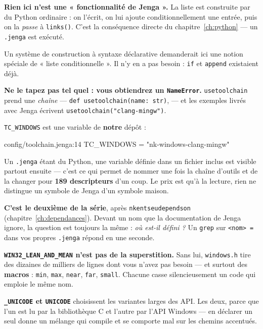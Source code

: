 \begin{nkretenir}
\textbf{Rien ici n'est une « fonctionnalité de Jenga ».} La liste est construite
par du Python ordinaire : on l'écrit, on lui ajoute conditionnellement une
entrée, puis on la \emph{passe} à \texttt{links()}. C'est la conséquence directe
du chapitre~\ref{ch:python} --- un \texttt{.jenga} est exécuté.

Un système de construction à syntaxe déclarative demanderait ici une notion
spéciale de « liste conditionnelle ». Il n'y en a pas besoin : \texttt{if} et
\texttt{append} existaient déjà.
\end{nkretenir}

\begin{nkpiege}
\alerte{}\textbf{Ne le tapez pas tel quel : vous obtiendrez un
\texttt{NameError}.} \texttt{usetoolchain} prend une \emph{chaîne} ---
\texttt{def usetoolchain(name: str)},  --- et
les exemples livrés avec Jenga écrivent \texttt{usetoolchain("clang-mingw")}.

\texttt{TC\_WINDOWS} est une variable de \textbf{notre} dépôt :

\begin{nkcode}{config/toolchain.jenga:14}
TC_WINDOWS = "nk-windows-clang-mingw"
\end{nkcode}

Un \texttt{.jenga} étant du Python, une variable définie dans un fichier inclus
est visible partout ensuite --- c'est ce qui permet de nommer une fois la chaîne
d'outils et de la changer pour \textbf{189 descripteurs} d'un coup. Le prix est
qu'à la lecture, rien ne distingue un symbole de Jenga d'un symbole maison.

\textbf{C'est le deuxième de la série}, après \texttt{nkentseudependson}
(chapitre~\ref{ch:dependances}). Devant un nom que la documentation de Jenga
ignore, la question est toujours la même : \emph{où est-il défini ?} Un
\texttt{grep} sur \texttt{<nom> =} dans vos propres \texttt{.jenga} répond en
une seconde.
\end{nkpiege}

\begin{nkretenir}
\textbf{\texttt{WIN32\_LEAN\_AND\_MEAN} n'est pas de la superstition.} Sans lui,
\texttt{windows.h} tire des dizaines de milliers de lignes dont vous n'avez pas
besoin --- et surtout des \textbf{macros} : \texttt{min}, \texttt{max},
\texttt{near}, \texttt{far}, \texttt{small}. Chacune casse silencieusement un
code qui emploie le même nom.

\textbf{\texttt{\_UNICODE} et \texttt{UNICODE}} choisissent les variantes larges
des API. Les deux, parce que l'un est lu par la bibliothèque C et l'autre par
l'API Windows --- en déclarer un seul donne un mélange qui compile et se comporte
mal sur les chemins accentués.
\end{nkretenir}

